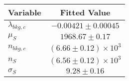 \begin{tabular}[t]{lc}
\hline
Variable &Fitted Value\\
\hline\hline
$\lambda_{bkg,c}$&$-0.00421\pm0.00045$\\
\hline
$\mu_{S}$&$1968.67\pm0.17$\\
\hline
$n_{bkg,c}$&$(6.66\pm0.12)\times 10^3$\\
\hline
$n_{S}$&$(6.56\pm0.12)\times 10^3$\\
\hline
$\sigma_{S}$&$9.28\pm0.16$\\
\hline
\end{tabular}